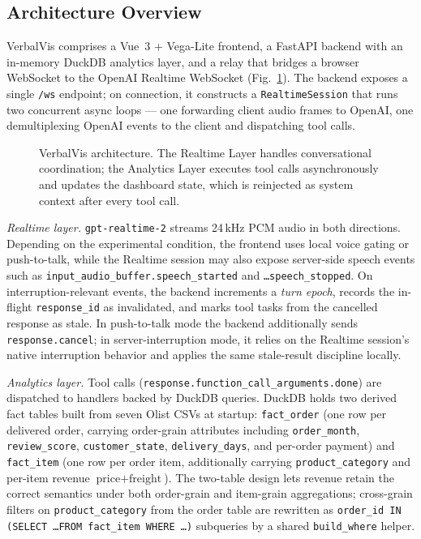 \documentclass[journal]{IEEEtran}
\begin{document}
\subsection{Architecture Overview}
VerbalVis comprises a Vue~3 + Vega-Lite frontend, a FastAPI backend with an in-memory DuckDB analytics layer, and a relay that bridges a browser WebSocket to the OpenAI Realtime WebSocket (Fig.~\ref{fig:arch}). The backend exposes a single \texttt{/ws} endpoint; on connection, it constructs a \texttt{RealtimeSession} that runs two concurrent async loops --- one forwarding client audio frames to OpenAI, one demultiplexing OpenAI events to the client and dispatching tool calls.

\begin{figure}[t]
\centering
{}
\caption{VerbalVis architecture. The Realtime Layer handles conversational coordination; the Analytics Layer executes tool calls asynchronously and updates the dashboard state, which is reinjected as system context after every tool call.}
\label{fig:arch}
\end{figure}

\noindent\emph{Realtime layer.} \texttt{gpt-realtime-2} streams 24\,kHz PCM audio in both directions. Depending on the experimental condition, the frontend uses local voice gating or push-to-talk, while the Realtime session may also expose server-side speech events such as \texttt{input\_audio\_buffer.speech\_started} and \texttt{\dots speech\_stopped}. On interruption-relevant events, the backend increments a \emph{turn epoch}, records the in-flight \texttt{response\_id} as invalidated, and marks tool tasks from the cancelled response as stale. In push-to-talk mode the backend additionally sends \texttt{response.cancel}; in server-interruption mode, it relies on the Realtime session's native interruption behavior and applies the same stale-result discipline locally.

\noindent\emph{Analytics layer.} Tool calls (\texttt{response.function\_call\_arguments.done}) are dispatched to handlers backed by DuckDB queries. DuckDB holds two derived fact tables built from seven Olist CSVs at startup: \texttt{fact\_order} (one row per delivered order, carrying order-grain attributes including \texttt{order\_month}, \texttt{review\_score}, \texttt{customer\_state}, \texttt{delivery\_days}, and per-order payment) and \texttt{fact\_item} (one row per order item, additionally carrying \texttt{product\_category} and per-item revenue $\textrm{price} + \textrm{freight}$). The two-table design lets revenue retain the correct semantics under both order-grain and item-grain aggregations; cross-grain filters on \texttt{product\_category} from the order table are rewritten as \texttt{order\_id IN (SELECT \dots FROM fact\_item WHERE \dots)} subqueries by a shared \texttt{build\_where} helper.
\end{document}
